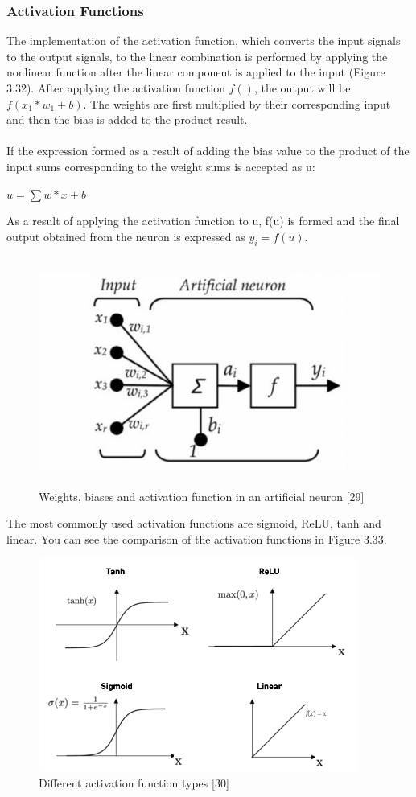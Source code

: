 \documentclass[12pt,twoside,a4]{mwbk}
\begin{document}
\subsubsection{Activation Functions}
The implementation of the activation function, which converts the input signals to the output signals, to the linear combination is performed by applying the nonlinear function after the linear component is applied to the input (Figure 3.32). After applying the activation function \textbf{$f()$}, the output will be \textbf{$f(x_1*w_1+b)$}. The weights are first multiplied by their corresponding input and then the bias is added to the product result. 
\\ \\
If the expression formed as a result of adding the bias value to the product of the input sums corresponding to the weight sums is accepted as u: 
\begin{center}
    $u = \sum w * x + b $
\end{center}

\noindent As a result of applying the activation function to u, f(u) is formed and the final output obtained from the neuron is expressed as $y_i=f(u)$.
\begin{figure}[h]
    \centering
    \includegraphics[width=13cm, height=7.5cm]{weight-bias.png}
    \caption{Weights, biases and activation function in an artificial neuron [29]}
\end{figure}

\noindent The most commonly used activation functions are sigmoid, ReLU, tanh and linear. You can see the comparison of the activation functions in Figure 3.33.
\begin{figure}[h]
    \centering
    \includegraphics[width=10.5cm, height=7.0cm]{activation-functions.jpeg}
    \caption{Different activation function types [30]}
\end{figure}
\end{document}
